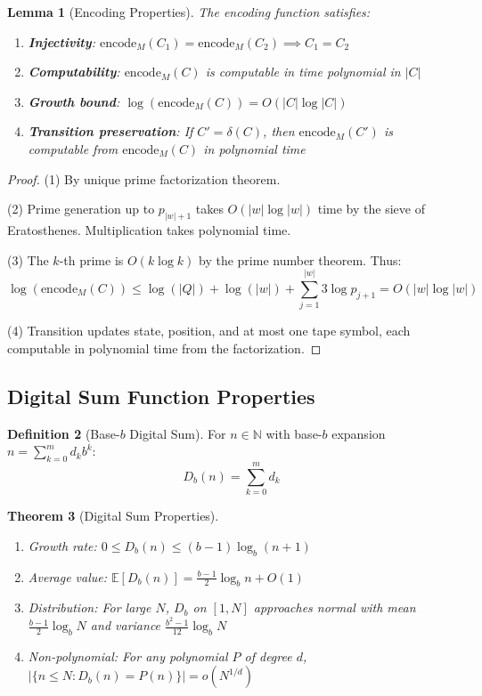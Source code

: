 \documentclass[12pt]{article}
\theoremstyle{plain}
\newtheorem{theorem}{Theorem}[section]
\newtheorem{lemma}[theorem]{Lemma}
\theoremstyle{definition}
\newtheorem{definition}[theorem]{Definition}
\newcommand{\N}{\mathbb{N}}
\newcommand{\digitalsum}{D}
\newcommand{\encode}{\text{encode}}
\begin{document}
\begin{lemma}[Encoding Properties]
\label{lem:encoding_props}
The encoding function satisfies:
\begin{enumerate}
\item \textbf{Injectivity}: $\encode_M(C_1) = \encode_M(C_2) \implies C_1 = C_2$
\item \textbf{Computability}: $\encode_M(C)$ is computable in time polynomial in $|C|$
\item \textbf{Growth bound}: $\log(\encode_M(C)) = O(|C| \log |C|)$
\item \textbf{Transition preservation}: If $C' = \delta(C)$, then $\encode_M(C')$ is computable from $\encode_M(C)$ in polynomial time
\end{enumerate}
\end{lemma}

\begin{proof}
(1) By unique prime factorization theorem.

(2) Prime generation up to $p_{|w|+1}$ takes $O(|w| \log |w|)$ time by the sieve of Eratosthenes. Multiplication takes polynomial time.

(3) The $k$-th prime is $O(k \log k)$ by the prime number theorem. Thus:
\begin{equation}
\log(\encode_M(C)) \leq \log(|Q|) + \log(|w|) + \sum_{j=1}^{|w|} 3\log p_{j+1} = O(|w| \log |w|)
\end{equation}

(4) Transition updates state, position, and at most one tape symbol, each computable in polynomial time from the factorization.
\end{proof}

\subsection{Digital Sum Function Properties}

\begin{definition}[Base-$b$ Digital Sum]
For $n \in \N$ with base-$b$ expansion $n = \sum_{k=0}^{m} d_k b^k$:
\begin{equation}
\digitalsum_b(n) = \sum_{k=0}^{m} d_k
\end{equation}
\end{definition}

\begin{theorem}[Digital Sum Properties]
\label{thm:digitalsum_props}
\begin{enumerate}
\item Growth rate: $0 \leq \digitalsum_b(n) \leq (b-1)\log_b(n+1)$
\item Average value: $\mathbb{E}[\digitalsum_b(n)] = \frac{b-1}{2} \log_b n + O(1)$
\item Distribution: For large $N$, $\digitalsum_b$ on $[1,N]$ approaches normal with mean $\frac{b-1}{2}\log_b N$ and variance $\frac{b^2-1}{12}\log_b N$
\item Non-polynomial: For any polynomial $P$ of degree $d$, $|\{n \leq N : \digitalsum_b(n) = P(n)\}| = o(N^{1/d})$
\end{enumerate}
\end{theorem}
\end{document}

